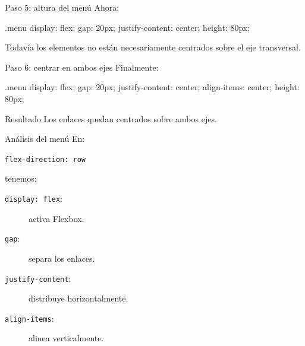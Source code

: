 \documentclass[aspectratio=169,11.5pt]{beamer}
\begin{document}
    \begin{frame}[fragile]{Paso 5: altura del menú}
        Ahora:

        \begin{csscodedark}
            .menu {
                display: flex;
                gap: 20px;
                justify-content: center;
                height: 80px;
            }
        \end{csscodedark}

        Todavía los elementos no están necesariamente
        centrados sobre el eje transversal.
    \end{frame}

    \begin{frame}[fragile]{Paso 6: centrar en ambos ejes}
        Finalmente:

        \begin{csscodedark}
            .menu {
                display: flex;
                gap: 20px;
                justify-content: center;
                align-items: center;
                height: 80px;
            }
        \end{csscodedark}

        \begin{block}{Resultado}
            Los enlaces quedan centrados
            sobre ambos ejes.
        \end{block}
    \end{frame}

    \begin{frame}{Análisis del menú}
        En:

        \begin{center}
            \texttt{flex-direction: row}
        \end{center}

        tenemos:

        \begin{description}
            \item[\texttt{display: flex}:]
            activa Flexbox.

            \item[\texttt{gap}:]
            separa los enlaces.

            \item[\texttt{justify-content}:]
            distribuye horizontalmente.

            \item[\texttt{align-items}:]
            alinea verticalmente.
        \end{description}
    \end{frame}
\end{document}
